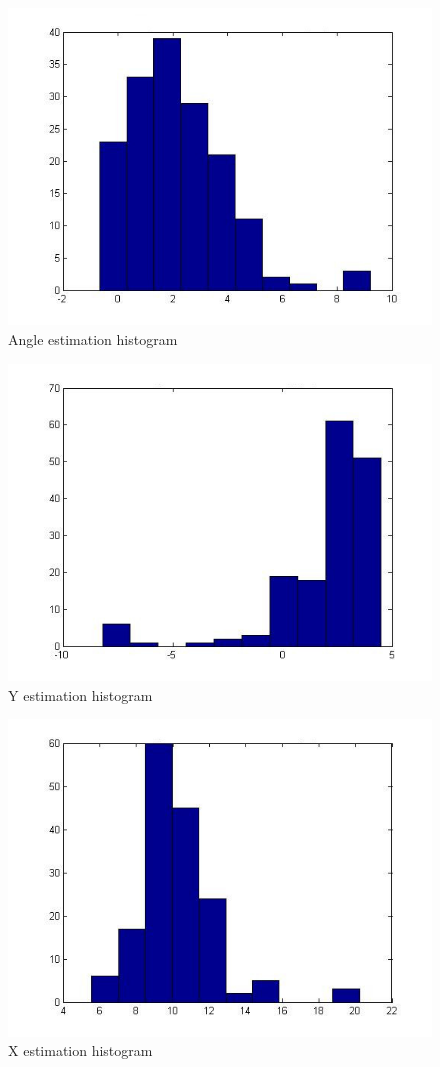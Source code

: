 \begin{figure}[hbt]
    \centering
    \includegraphics[scale=0.3]{img/chartangl.jpg}
    \caption{Angle estimation histogram\label{anglchart}}
\end{figure}

\begin{figure}[hbt]
    \centering
    \includegraphics[scale=0.3]{img/charty.jpg}
    \caption{Y estimation histogram\label{ychart}}
\end{figure}
\begin{figure}[hbt]
    \centering
    \includegraphics[scale=0.3]{img/chartx.jpg}
    \caption{X estimation histogram\label{xchart}}
\end{figure}



